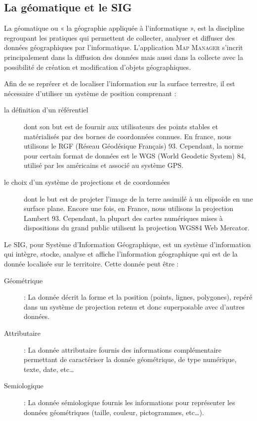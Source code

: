 \documentclass{rapportUHA40}
\begin{document}
\subsection{La géomatique et le SIG}
La géomatique ou « la géographie appliquée à l'informatique », est la
discipline regroupant les pratiques qui permettent de collecter, analyser et
diffuser des données géographiques par l'informatique. L'application
\textsc{Map Manager} s'incrit principalement dans la diffusion des données mais
aussi dans la collecte avec la possibilité de création et modification d'objets
géographiques.

Afin de se reprérer et de localiser l'information sur la surface terrestre, il
est nécessaire d'utiliser un système de position comprenant :
\begin{description}
  \item[la définition d'un référentiel] dont son but est de fournir aux utilisateurs
    des points stables et matérialisés par des bornes de coordonnées connues. En
    france, nous utilisons le RGF (Réseau Géodésique Français) 93. Cependant, la
    norme pour certain format de données est le WGS (World Geodetic System) 84,
    utilisé par les américains et associé au système GPS\@.
  \item[le choix d'un système de projections et de coordonnées] dont le but est de
    projeter l'image de la terre assimilé à un elipsoïde en une surface plane.
    Encore une fois, en France, nous utilisons la projection Lambert 93. Cependant,
    la plupart des cartes numériques mises à dispositions du grand public utilisent
    la projection WGS84 Web Mercator.
\end{description}

Le SIG, pour Système d'Information Géographique, est un système d’information
qui intègre, stocke, analyse et affiche l'information géographique qui est de
la donnée localisée sur le territoire. Cette donnée peut être :
\begin{description}
  \item[Géométrique] : La donnée décrit la forme et la position (points, lignes,
    polygones), repéré dans un système de projection retenu et donc superposable
    avec d'autres données.
  \item[Attributaire] : La donnée attributaire fournis des informations complémentaire
    permettant de caractériser la donnée géométrique, de type numérique, texte,
    date, etc\ldots
  \item[Semiologique] : La donnée sémiologique fournis les informations pour
    représenter les données géométriques (taille, couleur, pictogrammes,
    etc\ldots).
\end{description}
\end{document}
